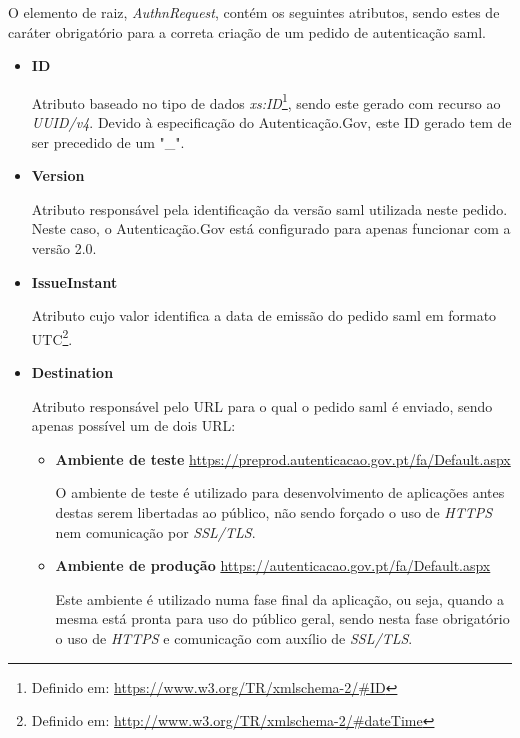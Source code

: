 \vspace{-7mm}
O elemento de raiz, \emph{AuthnRequest}, contém os seguintes atributos, sendo estes de caráter obrigatório para a correta criação de um pedido de autenticação \gls{saml}.

\begin{itemize}
    \item \textbf{ID}
    
    Atributo baseado no tipo de dados \emph{xs:ID}\footnote{Definido em: \url{https://www.w3.org/TR/xmlschema-2/\#ID}}, sendo este gerado com recurso ao \emph{UUID\//v4}. Devido à especificação do Autenticação.Gov, este ID gerado tem de ser precedido de um "\_".
    
    \item \textbf{Version}
    
    Atributo responsável pela identificação da versão \gls{saml} utilizada neste pedido. Neste caso, o Autenticação.Gov está configurado para apenas funcionar com a versão 2.0.
    
    \item \textbf{IssueInstant}
    
    Atributo cujo valor identifica a data de emissão do pedido \gls{saml} em formato UTC\footnote{Definido em: \url{http://www.w3.org/TR/xmlschema-2/\#dateTime}}.
    
    \item \textbf{Destination}
    
    Atributo responsável pelo URL para o qual o pedido \gls{saml} é enviado, sendo apenas possível um de dois URL:
    \begin{itemize}
        \item \textbf{Ambiente de teste } \url{https://preprod.autenticacao.gov.pt/fa/Default.aspx}
        
        O ambiente de teste é utilizado para desenvolvimento de aplicações antes destas serem libertadas ao público, não sendo forçado o uso de \emph{HTTPS} nem comunicação por \emph{SSL/TLS}.
        
        \item \textbf{Ambiente de produção } \url{https://autenticacao.gov.pt/fa/Default.aspx} 
        
        Este ambiente é utilizado numa fase final da aplicação, ou seja, quando a mesma está pronta para uso do público geral, sendo nesta fase obrigatório o uso de \emph{HTTPS} e comunicação com auxílio de \emph{SSL/TLS}.
    \end{itemize}
    

\end{itemize}
